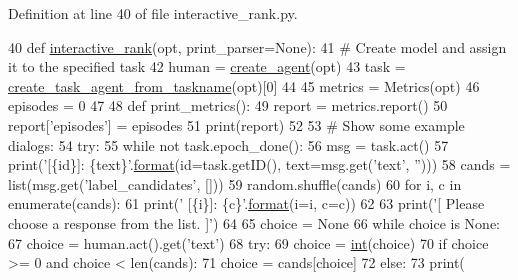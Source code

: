 Definition at line 40 of file interactive\+\_\+rank.\+py.


\begin{DoxyCode}
40 \textcolor{keyword}{def }\hyperlink{namespaceparlai_1_1scripts_1_1interactive__rank_a9997f1d0eba4a72a45a773ec05874af3}{interactive\_rank}(opt, print\_parser=None):
41     \textcolor{comment}{# Create model and assign it to the specified task}
42     human = \hyperlink{namespaceparlai_1_1core_1_1agents_ad0d54074d4bcc148bb415ab5515a53b5}{create\_agent}(opt)
43     task = \hyperlink{namespaceparlai_1_1core_1_1agents_ab4473fa54af02b5ab385b41b51dacd10}{create\_task\_agent\_from\_taskname}(opt)[0]
44 
45     metrics = Metrics(opt)
46     episodes = 0
47 
48     \textcolor{keyword}{def }print\_metrics():
49         report = metrics.report()
50         report[\textcolor{stringliteral}{'episodes'}] = episodes
51         print(report)
52 
53     \textcolor{comment}{# Show some example dialogs:}
54     \textcolor{keywordflow}{try}:
55         \textcolor{keywordflow}{while} \textcolor{keywordflow}{not} task.epoch\_done():
56             msg = task.act()
57             print(\textcolor{stringliteral}{'[\{id\}]: \{text\}'}.\hyperlink{namespaceparlai_1_1chat__service_1_1services_1_1messenger_1_1shared__utils_a32e2e2022b824fbaf80c747160b52a76}{format}(id=task.getID(), text=msg.get(\textcolor{stringliteral}{'text'}, \textcolor{stringliteral}{''})))
58             cands = list(msg.get(\textcolor{stringliteral}{'label\_candidates'}, []))
59             random.shuffle(cands)
60             \textcolor{keywordflow}{for} i, c \textcolor{keywordflow}{in} enumerate(cands):
61                 print(\textcolor{stringliteral}{'    [\{i\}]: \{c\}'}.\hyperlink{namespaceparlai_1_1chat__service_1_1services_1_1messenger_1_1shared__utils_a32e2e2022b824fbaf80c747160b52a76}{format}(i=i, c=c))
62 
63             print(\textcolor{stringliteral}{'[ Please choose a response from the list. ]'})
64 
65             choice = \textcolor{keywordtype}{None}
66             \textcolor{keywordflow}{while} choice \textcolor{keywordflow}{is} \textcolor{keywordtype}{None}:
67                 choice = human.act().get(\textcolor{stringliteral}{'text'})
68                 \textcolor{keywordflow}{try}:
69                     choice = \hyperlink{namespacelanguage__model_1_1eval__ppl_a7d12ee00479673c5c8d1f6d01faa272a}{int}(choice)
70                     \textcolor{keywordflow}{if} choice >= 0 \textcolor{keywordflow}{and} choice < len(cands):
71                         choice = cands[choice]
72                     \textcolor{keywordflow}{else}:
73                         print(

\end{DoxyCode}

